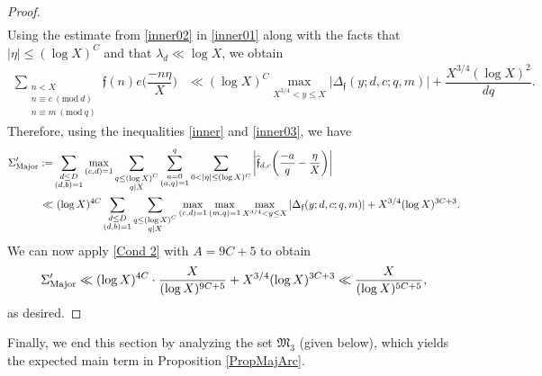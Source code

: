 \documentclass[12pt]{amsart}
\numberwithin{equation}{section}
\theoremstyle{remark}
\theoremstyle{definition}
\newcommand{\imod}[1]{\ (\mathrm{mod}\ #1)}
\begin{document}
\begin{proof}
\begin{align}
\end{align}
Using the estimate from \eqref{inner02} in \eqref{inner01} along with the facts that $|\eta| \leq (\log X)^C$ and that $\lambda_d\ll \log X$, we obtain
\begin{align}
\label{inner03} \sum_{\substack{n<X\\n\equiv c \imod{d}\\n\equiv m\imod q}}\mathfrak{f}(n)e\bigg(\dfrac{-n \eta }{X}\bigg) 
 &\ll (\log X)^C\max_{X^{3/4}< y\leq X}\big|\Delta_{\mathfrak{f}}(y; d, c; q, m)\big|+ \dfrac{X^{3/4} (\log X)^2}{dq}.
\end{align}
Therefore, using the inequalities \eqref{inner} and \eqref{inner03}, we have
\begin{align}
\notag \Sigma_{\textup{Major}}' :=&\sum_{\substack{d\leq D\\(d,b)=1}}\max_{(c,d)=1}\sum_{\substack{q\leq (\log X)^C\\q|X}}\sum_{\substack{a=0\\(a,q)=1}}^q\sum_{0<|\eta|\leq (\log X)^C}\bigg|\widehat{\mathfrak{f}}_{d,c}\bigg(\dfrac{-a}{q}-\dfrac{\eta}{X}\bigg)\bigg|\\
\notag \ll &~(\log X)^{4C}\sum_{\substack{d\leq D\\(d,b)=1}}\sum_{\substack{q\leq (\log X)^C\\q|X}}\max_{(c, d)=1} \max_{(m, q)=1}\max_{X^{3/4}<y\leq X}|\Delta_{\mathfrak{f}}(y; d, c; q, m)| + X^{3/4}(\log X)^{3C+3}.
\end{align}
We can now apply \ref{Cond 2} with $A=9C+5$ to obtain
\begin{align}\notag
\Sigma_{\textup{Major}}' \ll (\log X)^{4C} \cdot \dfrac{X}{(\log X)^{9C+5}} + X^{3/4}(\log X)^{3C+3} \ll \dfrac{X}{(\log X)^{5C+5}},
\end{align}
as desired.
\end{proof}












Finally, we end this section by analyzing the set $\mathfrak{M}_3$ (given below), which yields the expected main term in Proposition \ref{PropMajArc}.  
\end{document}
